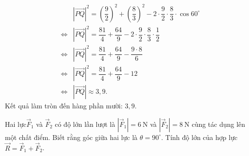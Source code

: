 \begin{ex}
{\begin{eqnarray*}
		&& \left|\overrightarrow{PQ}\right|^2 = \left(\dfrac{9}{2}\right)^2 + \left(\dfrac{8}{3}\right)^2 - 2 \cdot \dfrac{9}{2} \cdot \dfrac{8}{3} \cdot \cos 60^\circ\\
		&\Leftrightarrow & \left|\overrightarrow{PQ}\right|^2 = \dfrac{81}{4} + \dfrac{64}{9} - 2 \cdot \dfrac{9}{2} \cdot \dfrac{8}{3} \cdot \dfrac{1}{2}\\
		&\Leftrightarrow & \left|\overrightarrow{PQ}\right|^2 = \dfrac{81}{4} + \dfrac{64}{9} - \dfrac{9 \cdot 8}{6}\\
		&\Leftrightarrow & \left|\overrightarrow{PQ}\right|^2 = \dfrac{81}{4} + \dfrac{64}{9} - 12\\
		&\Leftrightarrow & \left|\overrightarrow{PQ}\right| \approx 3{,}9.
	\end{eqnarray*}
	Kết quả làm tròn đến hàng phần mười: $3{,}9$.
	}
\end{ex}
\begin{ex}%
	Hai lực$\overrightarrow{F}_1$ và $\overrightarrow{F}_2$ có độ lớn lần lượt là $\left|\overrightarrow{F}_1\right|=6\ \text{N}$ và $\left|\overrightarrow{F}_2\right|=8\ \text{N}$ cùng tác dụng lên một chất điểm. Biết rằng góc giữa hai lực là $\theta = 90^\circ$. Tính độ lớn của hợp lực $\overrightarrow{R} = \overrightarrow{F}_1 + \overrightarrow{F}_2$.
\end{ex}
